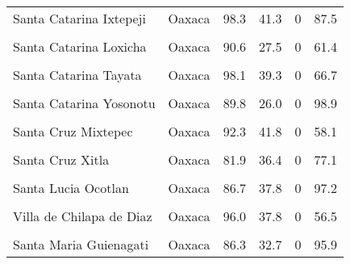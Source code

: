 \documentclass[
]{report}
\begin{document}
\begin{longtable}[t]{llrrrr}
\addlinespace
Santa Catarina Ixtepeji & Oaxaca & 98.3 & 41.3 & 0 & 87.5\\
\cellcolor{gray!6}{Santa Catarina Lachatao} & \cellcolor{gray!6}{Oaxaca} & \cellcolor{gray!6}{97.2} & \cellcolor{gray!6}{42.8} & \cellcolor{gray!6}{0} & \cellcolor{gray!6}{93.5}\\
Santa Catarina Loxicha & Oaxaca & 90.6 & 27.5 & 0 & 61.4\\
\cellcolor{gray!6}{Santa Catarina Mechoacan} & \cellcolor{gray!6}{Oaxaca} & \cellcolor{gray!6}{87.7} & \cellcolor{gray!6}{37.4} & \cellcolor{gray!6}{0} & \cellcolor{gray!6}{98.9}\\
Santa Catarina Tayata & Oaxaca & 98.1 & 39.3 & 0 & 66.7\\
\addlinespace
\cellcolor{gray!6}{Santa Catarina Ticua} & \cellcolor{gray!6}{Oaxaca} & \cellcolor{gray!6}{95.1} & \cellcolor{gray!6}{41.8} & \cellcolor{gray!6}{0} & \cellcolor{gray!6}{90.3}\\
Santa Catarina Yosonotu & Oaxaca & 89.8 & 26.0 & 0 & 98.9\\
\cellcolor{gray!6}{Santa Cruz Itundujia} & \cellcolor{gray!6}{Oaxaca} & \cellcolor{gray!6}{94.3} & \cellcolor{gray!6}{26.0} & \cellcolor{gray!6}{0} & \cellcolor{gray!6}{61.2}\\
Santa Cruz Mixtepec & Oaxaca & 92.3 & 41.8 & 0 & 58.1\\
\cellcolor{gray!6}{Santa Cruz Nundaco} & \cellcolor{gray!6}{Oaxaca} & \cellcolor{gray!6}{94.7} & \cellcolor{gray!6}{40.4} & \cellcolor{gray!6}{0} & \cellcolor{gray!6}{97.9}\\
\addlinespace
Santa Cruz Xitla & Oaxaca & 81.9 & 36.4 & 0 & 77.1\\
\cellcolor{gray!6}{Santa Ines Yatzeche} & \cellcolor{gray!6}{Oaxaca} & \cellcolor{gray!6}{76.5} & \cellcolor{gray!6}{32.6} & \cellcolor{gray!6}{0} & \cellcolor{gray!6}{98.9}\\
Santa Lucia Ocotlan & Oaxaca & 86.7 & 37.8 & 0 & 97.2\\
\cellcolor{gray!6}{Santa Maria Alotepec} & \cellcolor{gray!6}{Oaxaca} & \cellcolor{gray!6}{91.6} & \cellcolor{gray!6}{31.6} & \cellcolor{gray!6}{0} & \cellcolor{gray!6}{97.9}\\
Villa de Chilapa de Diaz & Oaxaca & 96.0 & 37.8 & 0 & 56.5\\
\addlinespace
\cellcolor{gray!6}{Santa Maria Ecatepec} & \cellcolor{gray!6}{Oaxaca} & \cellcolor{gray!6}{96.6} & \cellcolor{gray!6}{39.0} & \cellcolor{gray!6}{0} & \cellcolor{gray!6}{91.3}\\
Santa Maria Guienagati & Oaxaca & 86.3 & 32.7 & 0 & 95.9\\

\end{longtable}
\end{document}
